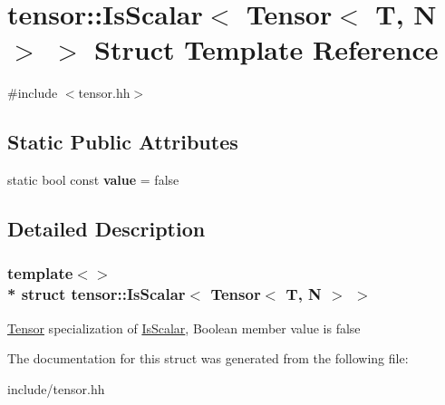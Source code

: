 \hypertarget{structtensor_1_1IsScalar_3_01Tensor_3_01T_00_01N_01_4_01_4}{}\section{tensor\+:\+:Is\+Scalar$<$ Tensor$<$ T, N $>$ $>$ Struct Template Reference}
\label{structtensor_1_1IsScalar_3_01Tensor_3_01T_00_01N_01_4_01_4}


{\ttfamily \#include $<$tensor.\+hh$>$}

\subsection*{Static Public Attributes}
\begin{DoxyCompactItemize}
\item 
static bool const {\bfseries value} = false\hypertarget{structtensor_1_1IsScalar_3_01Tensor_3_01T_00_01N_01_4_01_4_aa305a0ef38d371bdc7bc7de039ed97a9}{}\label{structtensor_1_1IsScalar_3_01Tensor_3_01T_00_01N_01_4_01_4_aa305a0ef38d371bdc7bc7de039ed97a9}

\end{DoxyCompactItemize}


\subsection{Detailed Description}
\subsubsection*{template$<$$>$\\*
struct tensor\+::\+Is\+Scalar$<$ Tensor$<$ T, N $>$ $>$}

\hyperlink{classtensor_1_1Tensor}{Tensor} specialization of \hyperlink{structtensor_1_1IsScalar}{Is\+Scalar}, Boolean member {\ttfamily value} is false 

The documentation for this struct was generated from the following file\+:\begin{DoxyCompactItemize}
\item 
include/tensor.\+hh\end{DoxyCompactItemize}
